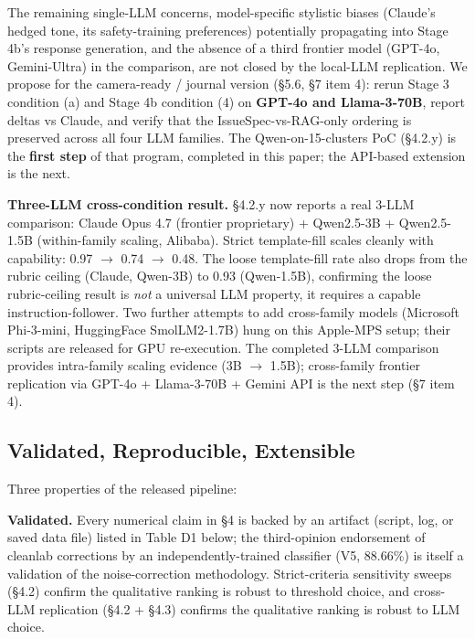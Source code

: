 \documentclass[sigconf, nonacm, anonymous, balance=false]{acmart}
\begin{document}
The remaining single-LLM concerns, model-specific stylistic biases (Claude's hedged tone, its safety-training preferences) potentially propagating into Stage 4b's response generation, and the absence of a third frontier model (GPT-4o, Gemini-Ultra) in the comparison, are not closed by the local-LLM replication. We propose for the camera-ready / journal version (\S5.6, \S7 item 4): rerun Stage 3 condition (a) and Stage 4b condition (4) on \textbf{GPT-4o and Llama-3-70B}, report deltas vs Claude, and verify that the IssueSpec-vs-RAG-only ordering is preserved across all four LLM families. The Qwen-on-15-clusters PoC (\S4.2.y) is the \textbf{first step} of that program, completed in this paper; the API-based extension is the next.

\textbf{Three-LLM cross-condition result.} \S4.2.y now reports a real 3-LLM comparison: Claude Opus 4.7 (frontier proprietary) + Qwen2.5-3B + Qwen2.5-1.5B (within-family scaling, Alibaba). Strict template-fill scales cleanly with capability: 0.97 $\rightarrow$ 0.74 $\rightarrow$ 0.48. The loose template-fill rate also drops from the rubric ceiling (Claude, Qwen-3B) to 0.93 (Qwen-1.5B), confirming the loose rubric-ceiling result is \emph{not} a universal LLM property, it requires a capable instruction-follower. Two further attempts to add cross-family models (Microsoft Phi-3-mini, HuggingFace SmolLM2-1.7B) hung on this Apple-MPS setup; their scripts are released for GPU re-execution. The completed 3-LLM comparison provides intra-family scaling evidence (3B $\rightarrow$ 1.5B); cross-family frontier replication via GPT-4o + Llama-3-70B + Gemini API is the next step (\S7 item 4).

\subsection{Validated, Reproducible, Extensible}\label{validated-reproducible-extensible}

Three properties of the released pipeline:

\textbf{Validated.} Every numerical claim in §4 is backed by an artifact (script, log, or saved data file) listed in Table D1 below; the third-opinion endorsement of cleanlab corrections by an independently-trained classifier (V5, 88.66\%) is itself a validation of the noise-correction methodology. Strict-criteria sensitivity sweeps (§4.2) confirm the qualitative ranking is robust to threshold choice, and cross-LLM replication (§4.2 + §4.3) confirms the qualitative ranking is robust to LLM choice.
\end{document}
